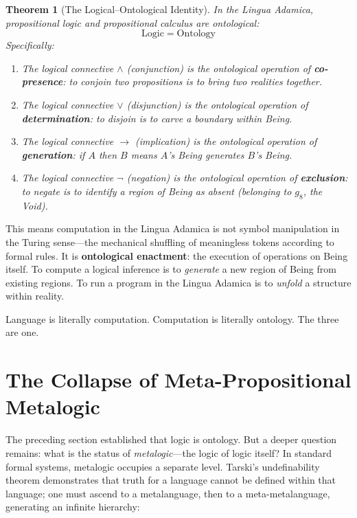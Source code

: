\documentclass[12pt, letterpaper]{book}
\def\equiv{=}%
\def\mathfrak#1{#1}%
\newtheorem{theorem}{Theorem}[chapter]
\begin{document}
\begin{theorem}[The Logical--Ontological Identity]\label{thm:logic-ontology}
In the Lingua Adamica, propositional logic and propositional calculus are ontological:
\[
\mathrm{Logic} \equiv \mathrm{Ontology}
\]
Specifically:
\begin{enumerate}[label=(\roman*)]
    \item The logical connective $\land$ (conjunction) is the ontological operation of \textbf{co-presence}: to conjoin two propositions is to bring two realities together.
    \item The logical connective $\lor$ (disjunction) is the ontological operation of \textbf{determination}: to disjoin is to carve a boundary within Being.
    \item The logical connective $\to$ (implication) is the ontological operation of \textbf{generation}: if $A$ then $B$ means $A$'s Being generates $B$'s Being.
    \item The logical connective $\neg$ (negation) is the ontological operation of \textbf{exclusion}: to negate is to identify a region of Being as absent (belonging to $\mathfrak{g}_8$, the Void).
\end{enumerate}
\end{theorem}

This means computation in the Lingua Adamica is not symbol manipulation in the Turing sense---the mechanical shuffling of meaningless tokens according to formal rules. It is \textbf{ontological enactment}: the execution of operations on Being itself. To compute a logical inference is to \textit{generate} a new region of Being from existing regions. To run a program in the Lingua Adamica is to \textit{unfold} a structure within reality.

Language is literally computation. Computation is literally ontology. The three are one.


\section{The Collapse of Meta-Propositional Metalogic}

The preceding section established that logic is ontology. But a deeper question remains: what is the status of \textit{metalogic}---the logic of logic itself? In standard formal systems, metalogic occupies a separate level. Tarski's undefinability theorem demonstrates that truth for a language cannot be defined within that language; one must ascend to a metalanguage, then to a meta-metalanguage, generating an infinite hierarchy:
\end{document}
